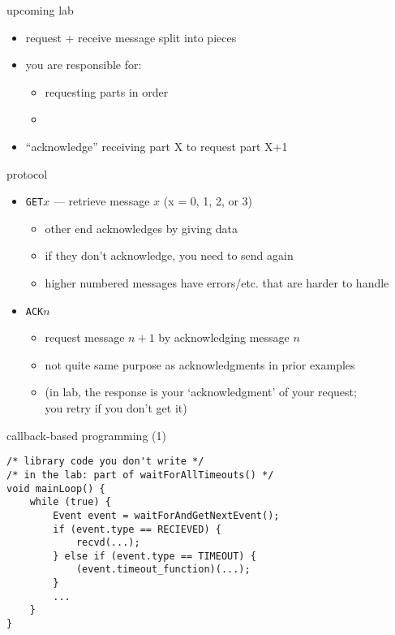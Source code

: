 \begin{frame}{upcoming lab}
    \begin{itemize}
    \item request + receive message split into pieces
    \item you are responsible for:
        \begin{itemize}
        \item requesting parts in order
        \item {}
        \end{itemize}
    \item ``acknowledge'' receiving part X to request part X+1
    \end{itemize}
\end{frame}

\begin{frame}{protocol}
    \begin{itemize}
    \item {\tt GET$x$} --- retrieve message $x$ (x = 0, 1, 2, or 3)
        \begin{itemize}
        \item other end acknowledges by giving data
        \item if they don't acknowledge, you need to send again
        \item higher numbered messages have errors/etc. that are harder to handle
        \end{itemize}
    \item {\tt ACK$n$ }
        \begin{itemize}
        \item request message $n + 1$ by acknowledging message $n$
        \item not quite same purpose as acknowledgments in prior examples
        \item (in lab, the response is your `acknowledgment' of your request; \\
            you retry if you don't get it)
        \end{itemize}
    \end{itemize}
\end{frame}


\begin{frame}[fragile]{callback-based programming (1)}
\begin{Verbatim}[fontsize=\small]
/* library code you don't write */
/* in the lab: part of waitForAllTimeouts() */
void mainLoop() {
    while (true) {
        Event event = waitForAndGetNextEvent();
        if (event.type == RECIEVED) {
            recvd(...);
        } else if (event.type == TIMEOUT) {
            (event.timeout_function)(...);
        }
        ...
    }
}
\end{Verbatim}
\end{frame}

